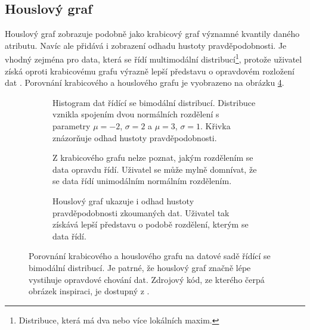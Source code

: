 \subsection*{Houslový graf}

Houslový graf zobrazuje podobně jako krabicový graf významné kvantily daného atributu. Navíc ale přidává i zobrazení odhadu hustoty pravděpodobnosti. Je vhodný zejména pro data, která se řídí multimodální distribucí\footnote{Distribuce, která má dva nebo více lokálních maxim.}, protože uživatel získá oproti krabicovému grafu výrazně lepší představu o opravdovém rozložení dat \cite{violin_plot}. Porovnání krabicového a houslového grafu je vyobrazeno na obrázku \ref{box_violin_plots}.


\begin{figure}[h]%
    \centering
    \begin{subfigure}{\textwidth}
        \centering
        \resizebox{1\textwidth}{!}
        {
            
        }
        \captionsetup{width=.9\linewidth}
        \caption{Histogram dat řídící se bimodální distribucí. Distribuce vznikla spojením dvou normálních rozdělení s parametry $\mu=-2$, $\sigma=2$ a $\mu=3$, $\sigma=1$. Křivka znázorňuje odhad hustoty pravděpodobnosti.}
        \label{sub:violin_density}
    \end{subfigure}
    \par\medskip
    \begin{subfigure}{\textwidth}
        \centering
        \resizebox{1\textwidth}{!}
        {
            
        }
        \captionsetup{width=.9\linewidth}
        \caption{Z krabicového grafu nelze poznat, jakým rozdělením se data opravdu řídí. Uživatel se může mylně domnívat, že se data řídí unimodálním normálním rozdělením.}
        \label{sub:violin_boxplot}
    \end{subfigure}
    \par\medskip
    \begin{subfigure}{\textwidth}
        \centering
        \resizebox{1\textwidth}{!}
        {
            
        }
        \captionsetup{width=.9\linewidth}
        \caption{Houslový graf ukazuje i odhad hustoty pravděpodobnosti zkoumaných dat. Uživatel tak získává lepší představu o podobě rozdělení, kterým se data řídí.}
        \label{sub:violin_violin}
    \end{subfigure}
    
    \caption{Porovnání krabicového a houslového grafu na datové sadě řídící se bimodální distribucí. Je patrné, že houslový graf značně lépe vystihuje opravdové chování dat. Zdrojový kód, ze kterého čerpá obrázek inspiraci, je dostupný z \cite{violin_plot}.}%
    \label{box_violin_plots}%
\end{figure}



